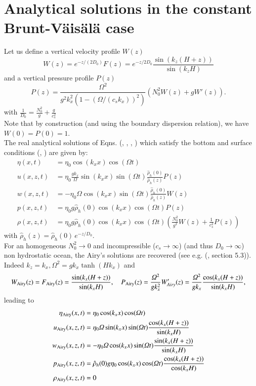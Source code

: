 \section{Analytical solutions in the constant Brunt-V\"ais\"al\"a case}
Let us define a vertical velocity profile $W(z)$
\[
W(z)=e^{-z/(2D_0)}F(z)=e^{-z/2D_0}\frac{\sin(k_z(H+z))}{\sin (k_z H)}
\]
and a vertical pressure profile $P(z)$
\[
P(z)=\frac{\Omega^2}{g^2k_x^2(1-(\Omega/(c_sk_x))^2)} \left( N^2_0W(z)+gW'(z) \right).
\]
with $\displaystyle \frac{1}{D_0}=\frac{N^2_0}{g}+\frac{g}{c_s^2}$\\
Note that by construction (and using the boundary dispersion relation), we have $W(0)=P(0)=1$.\\
The real analytical solutions of Eqns. (, , , )
which satisfy the bottom and surface conditions (, )
are given by:
\begin{align}
\eta(x,t)&=\eta_0 \cos(k_x x)\cos(\Omega t)\\
u(x,z,t)&=\eta_0 \frac{gk_x}{\Omega}\sin(k_xx)\sin(\Omega t) \frac{\hat{\rho}_h(0)}{\hat{\rho}_h(z)} P(z)\\
w(x,z,t)&=-\eta_0 \Omega \cos(k_xx)\sin(\Omega t)\frac{\hat{\rho}_h(0)}{\hat{\rho}_h(z)}W(z)\\
p(x,z,t)&=\eta_0 g \hat{\rho}_h(0) \cos(k_xx)\cos(\Omega t) P(z)\\
\rho(x,z,t)&=\eta_0 g \hat{\rho}_h(0)
\cos(k_xx)\cos(\Omega t) \left(\frac{N^2_0}{g^2} W(z)+\frac{1}{c_s^2}P(z)
\right)
\end{align}
with $\hat{\rho}_h(z)=\hat{\rho}_h(0)\,e^{-z/D_0}$.\\
For an homogeneous $N^2_0 \rightarrow 0$ and incompressible ($c_s \rightarrow \infty$) (and thus $D_0\rightarrow \infty$) non hydrostatic ocean, the Airy's solutions are recovered (see e.g. (\citealt{gill_1982}, section 5.3)). Indeed $k_z=k_x, \Omega^2=gk_x\tanh (Hk_x)$ and
\[
W_{\rm Airy}(z)=F_{\rm Airy}(z)=\frac{\sin(k_x(H+z))}{\sin (k_x H)},
\quad
P_{\rm Airy}(z)=\frac{\Omega^2}{gk_x^2} W_{Airy}'(z)=\frac{\Omega^2}{gk_x}\frac{\cos(k_x(H+z))}{\sin (k_x H)},
\]
leading to
\begin{align}
\eta_{\rm Airy}(x,t)&=\eta_0 \cos(k_x x)\cos(\Omega t)\\
u_{\rm Airy}(x,z,t)&=\eta_0 \Omega \sin(k_xx)\sin(\Omega t) \frac{\cos(k_x(H+z))}{\sin (k_x H)}\\
w_{\rm Airy}(x,z,t)&=-\eta_0 \Omega \cos(k_xx)\sin(\Omega t)\frac{\sin(k_x(H+z))}{\sin (k_x H)}\\
p_{\rm Airy}(x,z,t)&=\hat{\rho}_h(0) g \eta_0 \cos(k_xx)\cos(\Omega t) \frac{\cos(k_x(H+z))}{\cos (k_x H)}
\\
\rho_{\rm Airy}(x,z,t)&=0
\end{align}